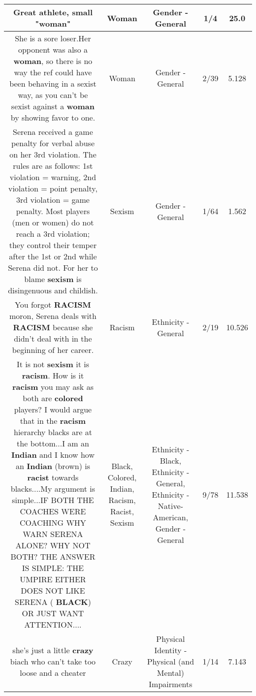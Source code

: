 \documentclass[11pt]{article}
\newlength\mylength
\begin{document}
\begin{center}
\begin{longtable}{|C{.65\mylength}|C{.30\mylength}|C{.12\mylength}|C{.12\mylength}|C{.12\mylength}|}
  \small Great athlete, small "\textbf{woman}"\normalsize   & Woman & Gender - General & 1/4 & 25.0 \\  \hline
  \small She is a sore loser.Her opponent was also a \textbf{woman}, so there is no way the ref could have been behaving in a sexist way, as you can't be sexist against a \textbf{woman} by showing favor to one.\normalsize   & Woman & Gender - General & 2/39 & 5.128 \\  \hline
  \small Serena received a game penalty for verbal abuse on her 3rd violation.  The rules are as follows: 1st violation = warning, 2nd violation = point penalty, 3rd violation = game penalty.  Most players (men or women) do not reach a 3rd violation; they control their temper after the 1st or 2nd while Serena did not.  For her to blame \textbf{sexism} is disingenuous and childish.\normalsize   & Sexism & Gender - General & 1/64 & 1.562 \\  \hline
  \small You forgot \textbf{RACISM} moron, Serena deals with \textbf{RACISM} because she didn't deal with in the beginning of her career.\normalsize   & Racism & Ethnicity - General & 2/19 & 10.526 \\  \hline
  \small It is not \textbf{sexism} it is \textbf{racism}. How is it \textbf{racism} you may ask as both are \textbf{colored} players? I would argue that in the \textbf{racism} hierarchy blacks are at the bottom...I am an \textbf{Indian} and I know how an \textbf{Indian} (brown) is \textbf{racist} towards blacks....My argument is simple...IF BOTH THE COACHES WERE COACHING WHY WARN SERENA ALONE? WHY NOT BOTH? THE ANSWER IS SIMPLE: THE UMPIRE EITHER DOES NOT LIKE SERENA ( \textbf{BLACK}) OR JUST WANT ATTENTION....\normalsize   & Black, Colored, Indian, Racism, Racist, Sexism & Ethnicity - Black, Ethnicity - General, Ethnicity - Native-American, Gender - General & 9/78 & 11.538 \\  \hline
  \small she's just a little \textbf{crazy} biach who can't take too loose and a cheater\normalsize   & Crazy & Physical Identity - Physical (and Mental) Impairments & 1/14 & 7.143 \\  \hline

\end{longtable}
\end{center}
\end{document}
